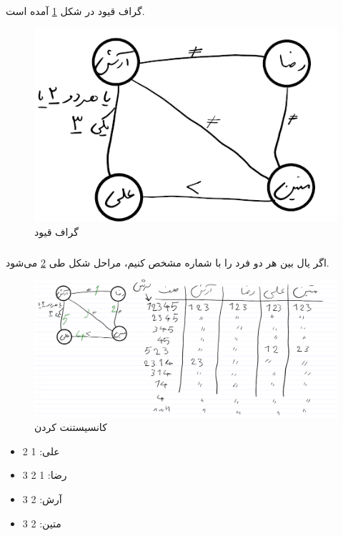 \documentclass{university}
\begin{document}
\subsubsection{}
گراف قیود در شکل 
\ref{fig:31}
آمده است.
\begin{figure}
    \centering
    \includegraphics[width=\textwidth]{assets/3-1.png}
    \caption{گراف قیود}
    \label{fig:31}
\end{figure}

\subsubsection{}
اگر یال بین هر دو فرد را با شماره مشخص کنیم، مراحل شکل طی 
\ref{fig:32}
می‌شود. 

\begin{figure}
    \centering
    \includegraphics[width=\textwidth]{assets/3-2.png}
    \caption{کانسیستنت کردن}
    \label{fig:32}
\end{figure}

 \begin{itemize}
     \item علی: 1 2
     \item رضا: 1 2 3
     \item آرش: 2 3
     \item متین: 2 3
 \end{itemize}
\end{document}
